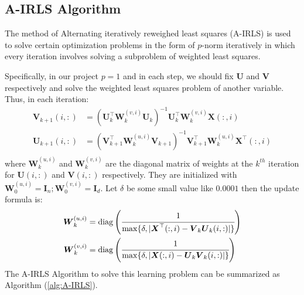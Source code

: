 \documentclass[conference]{IEEEtran}
\begin{document}
\subsection{A-IRLS Algorithm}
The method of Alternating iteratively reweighed least squares (A-IRLS) is used to solve certain optimization problems in the form of $p$-norm iteratively in which every iteration involves solving a subproblem of weighted least squares\cite{A-IRLS}.

Specifically, in our project $p=1$ and in each step, we should fix $\boldsymbol{U}$ and $\boldsymbol{V}$ respectively and solve the weighted least squares problem of another variable. Thus, in each iteration:
\begin{equation}
    \label{eq6}
	\begin{split}
		\boldsymbol{V}_{k+1}(i,:)&=(\boldsymbol{U}_{k}^{\top}\boldsymbol{W}^{(v,i)}_{k}\boldsymbol{U}_{k})^{-1}\boldsymbol{U}_{k}^{\top}\boldsymbol{W}^{(v,i)}_{k}\boldsymbol{X}(:,i)\\
		\boldsymbol{U}_{k+1}(i,:)&=(\boldsymbol{V}_{k+1}^{\top}\boldsymbol{W}^{(u,i)}_{k}\boldsymbol{V}_{k+1})^{-1}\boldsymbol{V}_{k+1}^{\top}\boldsymbol{W}^{(u,i)}_{k}\boldsymbol{X}^{\top}(:,i)\\
	\end{split}
\end{equation}
where $\boldsymbol{W}_k^{(u,i)}$ and $\boldsymbol{W}_k^{(v,i)}$ are the diagonal matrix of weights at the $k^{th}$ iteration for $\boldsymbol{U}\left(i,:\right)$ and $\boldsymbol{V}\left(i,:\right)$ respectively. They are initialized with $\boldsymbol{W}^{(u,i)}_{0}=\boldsymbol{I}_n; \boldsymbol{W}^{(v,i)}_{0}=\boldsymbol{I}_d$. Let $\delta$ be some small value like $0.0001$ then the update formula is:
\begin{equation}
    \label{eq8}
	\begin{split}
		\boldsymbol{W}^{(u,i)}_{k}&=\operatorname{diag}\left(\cfrac{1}{\operatorname{max}\{\delta, |\boldsymbol{X}^{\top}(:,i)-\boldsymbol{V}_{k}\boldsymbol{U}_{k}(i,:)|\}}\right)\\
		\boldsymbol{W}^{(v,i)}_{k}&=\operatorname{diag}\left(\cfrac{1}{\operatorname{max}\{\delta, |\boldsymbol{X}(:,i)-\boldsymbol{U}_{k}\boldsymbol{V}_{k}(i,:)|\}}\right)
	\end{split}
\end{equation}
The A-IRLS Algorithm to solve this learning problem can be summarized as Algorithm (\ref{alg:A-IRLS}).
\end{document}
